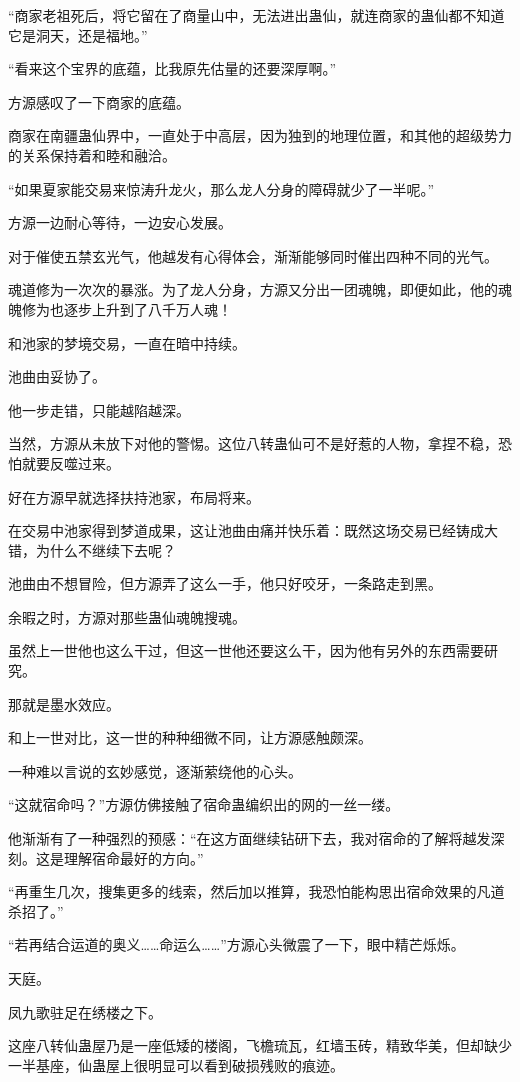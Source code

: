 \begin{this_body}
“商家老祖死后，将它留在了商量山中，无法进出蛊仙，就连商家的蛊仙都不知道它是洞天，还是福地。”

“看来这个宝界的底蕴，比我原先估量的还要深厚啊。”

方源感叹了一下商家的底蕴。

商家在南疆蛊仙界中，一直处于中高层，因为独到的地理位置，和其他的超级势力的关系保持着和睦和融洽。

“如果夏家能交易来惊涛升龙火，那么龙人分身的障碍就少了一半呢。”

方源一边耐心等待，一边安心发展。

对于催使五禁玄光气，他越发有心得体会，渐渐能够同时催出四种不同的光气。

魂道修为一次次的暴涨。为了龙人分身，方源又分出一团魂魄，即便如此，他的魂魄修为也逐步上升到了八千万人魂！

和池家的梦境交易，一直在暗中持续。

池曲由妥协了。

他一步走错，只能越陷越深。

当然，方源从未放下对他的警惕。这位八转蛊仙可不是好惹的人物，拿捏不稳，恐怕就要反噬过来。

好在方源早就选择扶持池家，布局将来。

在交易中池家得到梦道成果，这让池曲由痛并快乐着：既然这场交易已经铸成大错，为什么不继续下去呢？

池曲由不想冒险，但方源弄了这么一手，他只好咬牙，一条路走到黑。

余暇之时，方源对那些蛊仙魂魄搜魂。

虽然上一世他也这么干过，但这一世他还要这么干，因为他有另外的东西需要研究。

那就是墨水效应。

和上一世对比，这一世的种种细微不同，让方源感触颇深。

一种难以言说的玄妙感觉，逐渐萦绕他的心头。

“这就宿命吗？”方源仿佛接触了宿命蛊编织出的网的一丝一缕。

他渐渐有了一种强烈的预感：“在这方面继续钻研下去，我对宿命的了解将越发深刻。这是理解宿命最好的方向。”

“再重生几次，搜集更多的线索，然后加以推算，我恐怕能构思出宿命效果的凡道杀招了。”

“若再结合运道的奥义……命运么……”方源心头微震了一下，眼中精芒烁烁。

天庭。

凤九歌驻足在绣楼之下。

这座八转仙蛊屋乃是一座低矮的楼阁，飞檐琉瓦，红墙玉砖，精致华美，但却缺少一半基座，仙蛊屋上很明显可以看到破损残败的痕迹。


\end{this_body}
